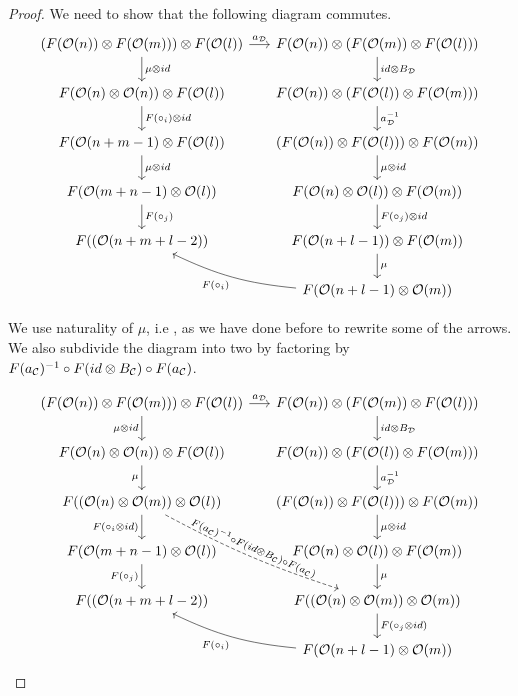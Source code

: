 \documentclass[Thesis.tex]{subfiles}
\begin{document}
\begin{proof}
   We need to show that the following diagram commutes.
   \[
\begin{tikzcd}[column sep = 1.5em]
(F(\OO(n))\otimes F(\OO(m)))\otimes F(\OO(l))\arrow[d, "\mu\otimes id"]\arrow[r, "a_\DD"]& F(\OO(n))\otimes (F(\OO(m))\otimes F(\OO(l)))\arrow[d, "id\otimes B_\DD"] \\
 F(\OO(n)\otimes\OO(n))\otimes F(\OO(l))\arrow[d, "F(\circ_i)\otimes id"]  & F(\OO(n))\otimes (F(\OO(l))\otimes F(\OO(m)))\arrow[d, "a_\DD^{-1}"]\\
 F(\OO(n+m-1)\otimes F(\OO(l))\arrow[d, "\mu\otimes id"] & (F(\OO(n))\otimes F(\OO(l)))\otimes F(\OO(m))\arrow[d, "\mu\otimes id"]\\
 F(\OO(m+n-1)\otimes\OO(l))\arrow[d, "F(\circ_j)"] & F(\OO(n)\otimes \OO(l))\otimes F(\OO(m))\arrow[d, "F(\circ_j)\otimes id"]\\
 F((\OO(n+m+l-2)) & F(\OO(n+l-1))\otimes F(\OO(m))\arrow[d, "\mu"]\\
  & F(\OO(n+l-1)\otimes\OO(m))\arrow[ul, "F(\circ_i)", bend left = 10]
\end{tikzcd}   
   \]
   
   We use naturality of $\mu$, i.e , as we have done before to rewrite some of the arrows. We also subdivide the diagram into two by factoring by $F(a_{\mathcal C})^{-1}\circ F(id\otimes B_{\mathcal C})\circ F(a_{\mathcal C})$.
   
   \[
\begin{tikzcd}[column sep = 1.5em]
(F(\OO(n))\otimes F(\OO(m)))\otimes F(\OO(l))\arrow[d, "\mu\otimes id"']\arrow[r, "a_\DD"]& F(\OO(n))\otimes (F(\OO(m))\otimes F(\OO(l)))\arrow[d, "id\otimes B_\DD"] \\
 F(\OO(n)\otimes\OO(n))\otimes F(\OO(l))\arrow[d, "\mu"'] & F(\OO(n))\otimes (F(\OO(l))\otimes F(\OO(m)))\arrow[d, "a_\DD^{-1}"]\\
 F((\OO(n)\otimes\OO(m))\otimes \OO(l))\arrow[d, "F(\circ_i\otimes id)"']\arrow[rdd, dashed, "F(a_\CC)^{-1}\circ F(id\otimes B_\CC)\circ F(a_\CC)", sloped, bend right = 5] & (F(\OO(n))\otimes F(\OO(l)))\otimes F(\OO(m))\arrow[d, "\mu\otimes id"]\\
 F(\OO(m+n-1)\otimes\OO(l))\arrow[d, "F(\circ_j)"'] & F(\OO(n)\otimes \OO(l))\otimes F(\OO(m))\arrow[d, "\mu"]\\
 F((\OO(n+m+l-2)) & F((\OO(n)\otimes\OO(m))\otimes \OO(m))\arrow[d, "F(\circ_j\otimes id)"]\\
  & F(\OO(n+l-1)\otimes\OO(m))\arrow[ul, "F(\circ_i)", bend left = 10]
\end{tikzcd}   
   \]
   

\end{proof}
\end{document}
